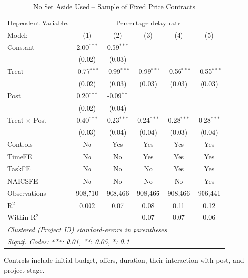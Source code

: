 \documentclass[
]{article}
\begin{document}
\begin{table}[htbp]
   \caption{No Set Aside Used -- Sample of Fixed Price Contracts}
   \centering
   \footnotesize
   \begin{tabular}{lccccc}
      \tabularnewline \midrule \midrule
      Dependent Variable: & \multicolumn{5}{c}{Percentage delay rate}\\
      Model:               & (1)           & (2)           & (3)           & (4)           & (5)\\  
      Constant             & 2.00$^{***}$  & 0.59$^{***}$  &               &               &   \\   
                           & (0.02)        & (0.03)        &               &               &   \\   
      Treat                & -0.77$^{***}$ & -0.99$^{***}$ & -0.99$^{***}$ & -0.56$^{***}$ & -0.55$^{***}$\\   
                           & (0.02)        & (0.03)        & (0.03)        & (0.03)        & (0.03)\\   
      Post                 & 0.20$^{***}$  & -0.09$^{**}$  &               &               &   \\   
                           & (0.02)        & (0.04)        &               &               &   \\   
      Treat $\times$ Post  & 0.40$^{***}$  & 0.23$^{***}$  & 0.24$^{***}$  & 0.28$^{***}$  & 0.28$^{***}$\\   
                           & (0.03)        & (0.04)        & (0.04)        & (0.03)        & (0.04)\\   
      Controls             & No            & Yes           & Yes           & Yes           & Yes\\  
      TimeFE               & No            & No            & Yes           & Yes           & Yes\\  
      TaskFE               & No            & No            & No            & Yes           & Yes\\  
      NAICSFE              & No            & No            & No            & No            & Yes\\  
      Observations         & 908,710       & 908,466       & 908,466       & 908,466       & 906,441\\  
      R$^2$                & 0.002         & 0.07          & 0.08          & 0.11          & 0.12\\  
      Within R$^2$         &               &               & 0.07          & 0.07          & 0.06\\  
      \midrule \midrule
      \multicolumn{6}{l}{\emph{Clustered (Project ID) standard-errors in parentheses}}\\
      \multicolumn{6}{l}{\emph{Signif. Codes: ***: 0.01, **: 0.05, *: 0.1}}\\
   \end{tabular}
   
   \par \raggedright 
   Controls include initial budget, offers, duration, their interaction with post, and project stage. 
\end{table}
\end{document}
